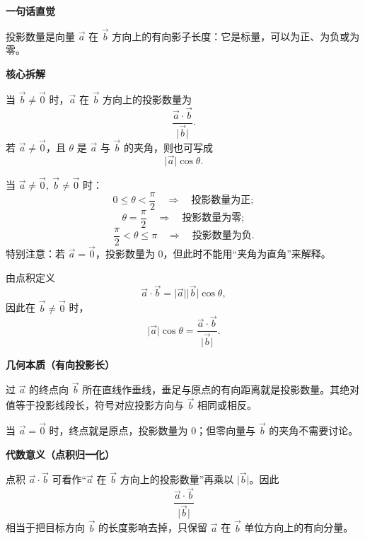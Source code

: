 \begin{explanationbox}

	\textbf{\textcolor{CExplanation}{一句话直觉}}

	投影数量是向量 $\vec a$ 在 $\vec b$ 方向上的有向影子长度：它是标量，可以为正、为负或为零。

	\medskip
	\textbf{\textcolor{CExplanation}{核心拆解}}
	\begin{description}[style=nextline, leftmargin=2.8em, labelsep=0.5em, itemsep=0.45em]
		\item[\textbf{要点一（数量公式）：}] 当 $\vec b\neq\vec 0$ 时，$\vec a$ 在 $\vec b$ 方向上的投影数量为
		      \[
			      \frac{\vec a\cdot\vec b}{\lvert\vec b\rvert}.
		      \]
		      若 $\vec a\neq\vec 0$，且 $\theta$ 是 $\vec a$ 与 $\vec b$ 的夹角，则也可写成
		      \[
			      \lvert\vec a\rvert\cos\theta .
		      \]

		\item[\textbf{要点二（符号判定）：}] 当 $\vec a\neq\vec 0,\ \vec b\neq\vec 0$ 时：
		      \[
			      0 \le \theta < \frac{\pi}{2}
			      \quad\Rightarrow\quad
			      \text{投影数量为正};
		      \]
		      \[
			      \theta = \frac{\pi}{2}
			      \quad\Rightarrow\quad
			      \text{投影数量为零};
		      \]
		      \[
			      \frac{\pi}{2} < \theta \le \pi
			      \quad\Rightarrow\quad
			      \text{投影数量为负}.
		      \]
		      特别注意：若 $\vec a=\vec 0$，投影数量为 $0$，但此时不能用“夹角为直角”来解释。

		\item[\textbf{要点三（点积关系）：}] 由点积定义
		      \[
			      \vec a\cdot\vec b=\lvert\vec a\rvert\lvert\vec b\rvert\cos\theta,
		      \]
		      因此在 $\vec b\neq\vec 0$ 时，
		      \[
			      \lvert\vec a\rvert\cos\theta
			      =
			      \frac{\vec a\cdot\vec b}{\lvert\vec b\rvert}.
		      \]
	\end{description}

	\medskip
	\textbf{\textcolor{CExplanation}{几何本质（有向投影长）}}

	过 $\vec a$ 的终点向 $\vec b$ 所在直线作垂线，垂足与原点的有向距离就是投影数量。其绝对值等于投影线段长，符号对应投影方向与 $\vec b$ 相同或相反。

	当 $\vec a=\vec 0$ 时，终点就是原点，投影数量为 $0$；但零向量与 $\vec b$ 的夹角不需要讨论。

	\medskip
	\textbf{\textcolor{CExplanation}{代数意义（点积归一化）}}

	点积 $\vec a\cdot\vec b$ 可看作“$\vec a$ 在 $\vec b$ 方向上的投影数量”再乘以 $\lvert\vec b\rvert$。因此
	\[
		\frac{\vec a\cdot\vec b}{\lvert\vec b\rvert}
	\]
	相当于把目标方向 $\vec b$ 的长度影响去掉，只保留 $\vec a$ 在 $\vec b$ 单位方向上的有向分量。


\end{explanationbox}
